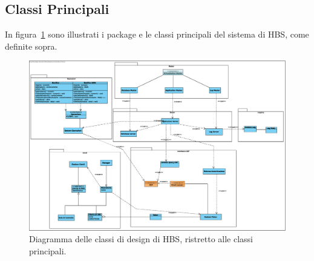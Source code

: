 
\subsection{Classi Principali}

In figura~\ref{fig:classi-principali} sono illustrati i package e le classi principali del sistema di HBS, come definite sopra.

\begin{figure}[h]
    \centering
    \includegraphics[width=\textheight, angle=90]{Images/Classi_Design.eps}
    \caption{Diagramma delle classi di design di HBS, ristretto alle classi principali.}
    \label{fig:classi-principali}
\end{figure}

